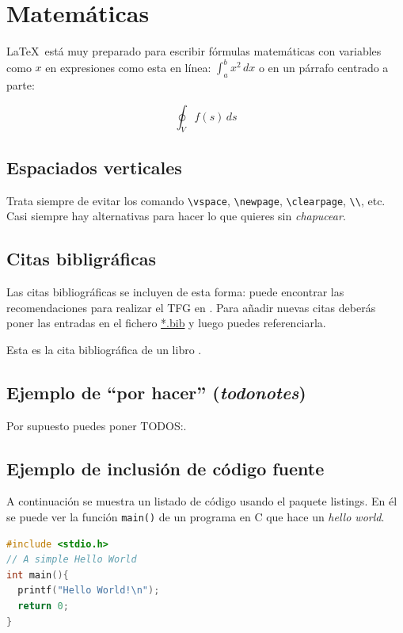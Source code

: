 \section{Matemáticas}

\LaTeX\ está muy preparado para escribir fórmulas matemáticas con variables como $x$ en expresiones como esta en línea: \(\int_{a}^{b} x^2 \,dx\) o en un párrafo centrado a parte:

\begin{displaymath}
  \oint_V f(s) \,ds
\end{displaymath}

\subsection{Espaciados verticales}

Trata siempre de evitar los comando \verb|\vspace|, \verb|\newpage|, \verb|\clearpage|, \verb|\\|, etc. Casi siempre hay alternativas para hacer lo que quieres sin \emph{chapucear}.

\subsection{Citas bibligráficas}

Las citas bibliográficas se incluyen de esta forma: puede encontrar
las recomendaciones para realizar el TFG en
\cite{recomendaciones}. Para añadir nuevas citas deberás poner las
entradas en el fichero \url{*.bib} y luego puedes referenciarla.

Esta es la cita bibliográfica de un libro \cite{stallings2006}.

\subsection{Ejemplo de ``por hacer'' (\emph{todonotes})}

Por supuesto puedes poner TODOS:.


\subsection{Ejemplo de inclusión de código fuente}

A continuación se muestra un listado de código usando el paquete listings. En él se puede ver la función \lstinline{main()} de un programa en C que hace un \emph{hello world}.
\begin{lstlisting}[language=c]
#include <stdio.h>
// A simple Hello World
int main(){
  printf("Hello World!\n");
  return 0;
}
\end{lstlisting}

